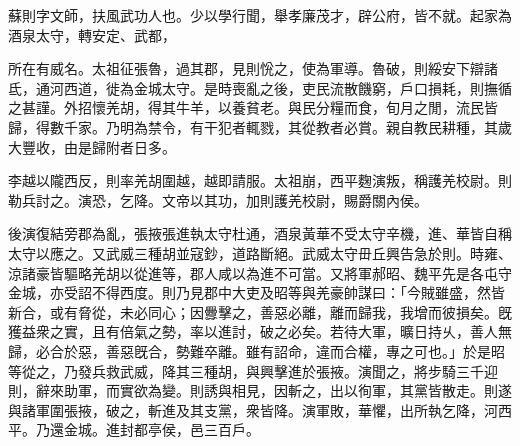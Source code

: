 \begin{pinyinscope}
 
 
 蘇則字文師，扶風武功人也。少以學行聞，舉孝廉茂才，辟公府，皆不就。起家為酒泉太守，轉安定、武都，
 
 
 所在有威名。太祖征張魯，過其郡，見則恱之，使為軍導。魯破，則綏安下辯諸氐，通河西道，徙為金城太守。是時喪亂之後，吏民流散饑窮，戶口損耗，則撫循之甚謹。外招懷羌胡，得其牛羊，以養貧老。與民分糧而食，旬月之閒，流民皆歸，得數千家。乃明為禁令，有干犯者輒戮，其從教者必賞。親自教民耕種，其歲大豐收，由是歸附者日多。
 
 
李越以隴西反，則率羌胡圍越，越即請服。太祖崩，西平麴演叛，稱護羌校尉。則勒兵討之。演恐，乞降。文帝以其功，加則護羌校尉，賜爵關內侯。
 
 
 
 
 後演復結旁郡為亂，張掖張進執太守杜通，酒泉黃華不受太守辛機，進、華皆自稱太守以應之。又武威三種胡並寇鈔，道路斷絕。武威太守毌丘興告急於則。時雍、涼諸豪皆驅略羌胡以從進等，郡人咸以為進不可當。又將軍郝昭、魏平先是各屯守金城，亦受詔不得西度。則乃見郡中大吏及昭等與羌豪帥謀曰：「今賊雖盛，然皆新合，或有脅從，未必同心；因釁擊之，善惡必離，離而歸我，我增而彼損矣。旣獲益衆之實，且有倍氣之勢，率以進討，破之必矣。若待大軍，曠日持乆，善人無歸，必合於惡，善惡旣合，勢難卒離。雖有詔命，違而合權，專之可也。」於是昭等從之，乃發兵救武威，降其三種胡，與興擊進於張掖。演聞之，將步騎三千迎則，辭來助軍，而實欲為變。則誘與相見，因斬之，出以徇軍，其黨皆散走。則遂與諸軍圍張掖，破之，斬進及其支黨，衆皆降。演軍敗，華懼，出所執乞降，河西平。乃還金城。進封都亭侯，邑三百戶。
 

\end{pinyinscope}

